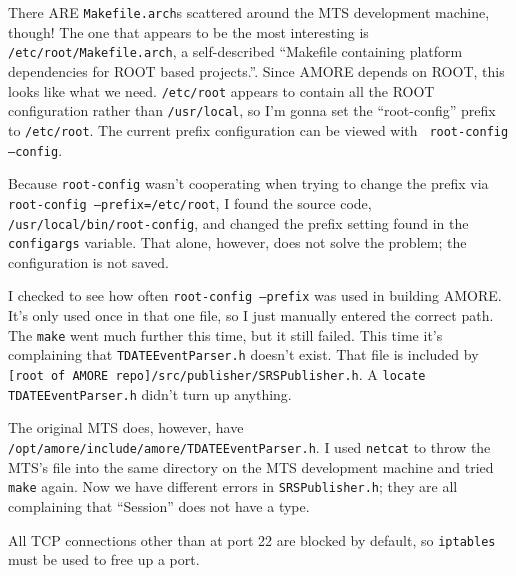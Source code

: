 \documentclass[12pt]{article}
\begin{document}
\qq There ARE {\tt Makefile.arch}s scattered around the MTS development machine,
though! The one that appears to be the most interesting is {\tt
  /etc/root/Makefile.arch}, a self-described ``Makefile containing platform
dependencies for ROOT based projects.''. Since AMORE depends on ROOT, this looks
like what we need. {\tt /etc/root} appears to contain all the ROOT configuration
rather than {\tt /usr/local}, so I'm gonna set the ``root-config'' prefix to
{\tt /etc/root}. The current prefix configuration can be viewed with {\tt
  root-config --config}.

\qq Because {\tt root-config} wasn't cooperating when trying to change the
prefix via \\{\tt root-config --prefix=/etc/root}, I found the source code, {\tt
  /usr/local/bin/root-config}, and changed the prefix setting found in the {\tt
  configargs} variable. That alone, however, does not solve the problem; the
configuration is not saved.

\qq I checked to see how often {\tt root-config --prefix} was used in building
AMORE. It's only used once in that one file, so I just manually entered the
correct path. The {\tt make} went much further this time, but it still
failed. This time it's complaining that {\tt TDATEEventParser.h} doesn't
exist. That file is included by {\tt [root of AMORE
  repo]/src/publisher/SRSPublisher.h}. A {\tt locate TDATEEventParser.h} didn't
turn up anything.  

\qq The original MTS does, however, have {\tt
  /opt/amore/include/amore/TDATEEventParser.h}. I used {\tt netcat} to throw the
MTS's file into the same directory on the MTS development machine and tried {\tt
  make} again. Now we have different errors in {\tt SRSPublisher.h}; they are
all complaining that ``Session'' does not have a type.

\begin{tcolorbox}[title=NOTE, colback=white, colframe=blue]
  All TCP connections other than at port 22 are blocked by
  default, so {\tt iptables} must be used to free up a port.
\end{tcolorbox}

\end{document}
